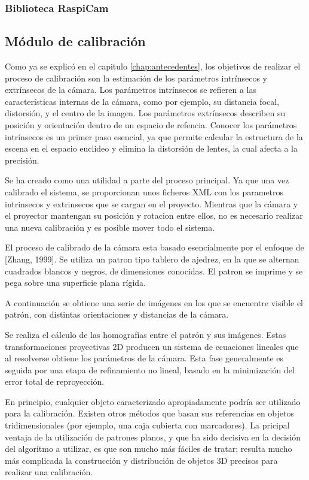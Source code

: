 \subsubsection{Biblioteca RaspiCam}



\subsection{Módulo de calibración}
Como ya se explicó en el capitulo \ref{chap:antecedentes}, los objetivos de realizar el proceso de calibración son la estimación de los parámetros intrínsecos y extrínsecos de la cámara. Los parámetros intrínsecos se refieren a las características internas de la cámara, como por ejemplo, su distancia focal, distorsión, y el centro de la imagen. Los parámetros extrínsecos describen su posición y orientación dentro de un espacio de refencia. Conocer los parámetros intrínsecos es un primer paso esencial, ya que permite calcular la estructura de la escena en el espacio euclideo y elimina la distorsión de lentes, la cual afecta a la precisión.

Se ha creado como una utilidad a parte del proceso principal. Ya que una vez calibrado el sistema, se proporcionan unos ficheros XML con los parametros intrinsecos y extrinsecos que se cargan en el proyecto. Mientras que la cámara y el proyector mantengan su posición y rotacion entre ellos, no es necesario realizar una nueva calibración y es posible mover todo el sistema.

El proceso de calibrado de la cámara esta basado esencialmente por el enfoque de [Zhang, 1999]. Se utiliza un patron tipo tablero de ajedrez, en la que se alternan cuadrados blancos y negros, de dimensiones conocidas. El patron se imprime y se pega sobre una superficie plana rígida.

A continuación se obtiene una serie de imágenes en los que se encuentre visible el patrón, con distintas orientaciones y distancias de la cámara. 

Se realiza el cálculo de las homografías entre el patrón y sus imágenes. Estas transformaciones proyectivas 2D producen un sistema de ecuaciones lineales que al resolverse obtiene los parámetros de la cámara. Esta fase generalmente es seguida por una etapa de refinamiento no lineal, basado en la minimización del error total de reproyección.

En principio, cualquier objeto caracterizado apropiadamente podría ser utilizado para la calibración. Existen otros métodos que basan sus referencias en objetos tridimensionales (por ejemplo, una caja cubierta con marcadores).  
La pricipal ventaja de la utilización de patrones planos, y que ha sido decisiva en la decisión del algoritmo a utilizar, es que son mucho más fáciles de tratar; resulta mucho más complicada la construcción y distribución de objetos 3D precisos para realizar una calibración.

